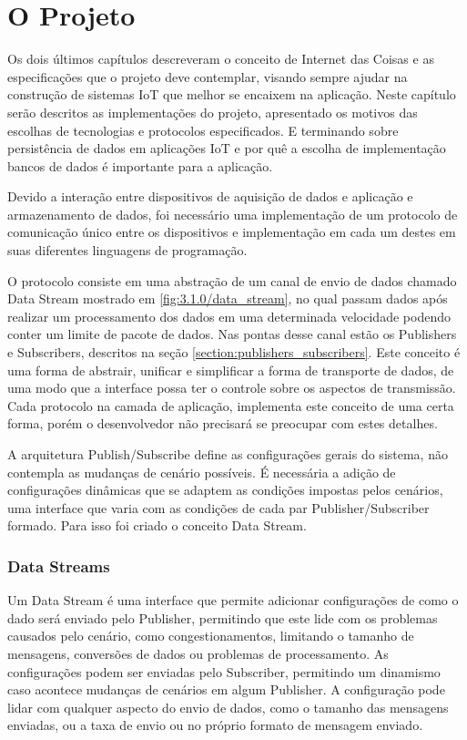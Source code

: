 \chapter{O Projeto}
\label{chapter:projeto}

Os dois últimos capítulos descreveram o conceito de Internet das Coisas e as especificações que o projeto deve contemplar, visando sempre ajudar na construção de sistemas IoT que melhor se encaixem na aplicação. Neste capítulo serão descritos as implementações do projeto, apresentado os motivos das escolhas de tecnologias e protocolos especificados. E terminando sobre persistência de dados em aplicações IoT e por quê a escolha de implementação bancos de dados é importante para a aplicação.

Devido a interação entre dispositivos de aquisição de dados e aplicação e armazenamento de dados, foi necessário uma implementação de um protocolo de comunicação único entre os dispositivos e implementação em cada um destes em suas diferentes linguagens de programação.

O protocolo consiste em uma abstração de um canal de envio de dados chamado Data Stream mostrado em \ref{fig:3.1.0/data_stream}, no qual passam dados após realizar um processamento dos dados em uma determinada velocidade podendo conter um limite de pacote de dados. Nas pontas desse canal estão os Publishers e Subscribers, descritos na seção \ref{section:publishers_subscribers}. Este conceito é uma forma de abstrair, unificar e simplificar a forma de transporte de dados, de uma modo que a interface possa ter o controle sobre os aspectos de transmissão. Cada protocolo na camada de aplicação, implementa este conceito de uma certa forma, porém o desenvolvedor não precisará se preocupar com estes detalhes.


A arquitetura Publish/Subscribe define as configurações gerais do sistema, não contempla as mudanças de cenário possíveis. É necessária a adição de configurações dinâmicas que se adaptem as condições impostas pelos cenários, uma interface que varia com as condições de cada par Publisher/Subscriber formado. Para isso foi criado o conceito Data Stream.


\subsection{Data Streams}
\label{section:data_stream}

Um Data Stream é uma interface que permite adicionar configurações de como o dado será enviado pelo Publisher, permitindo que este lide com os problemas causados pelo cenário, como congestionamentos, limitando o tamanho de mensagens, conversões de dados ou problemas de processamento. As configurações podem ser enviadas pelo Subscriber, permitindo um dinamismo caso acontece mudanças de cenários em algum Publisher. A configuração pode lidar com qualquer aspecto do envio de dados, como o tamanho das mensagens enviadas, ou a taxa de envio ou no próprio formato de mensagem enviado.


